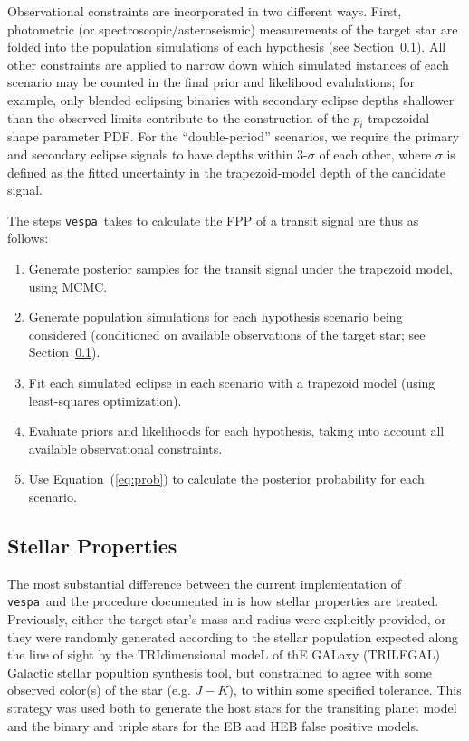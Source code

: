 \documentclass{emulateapj}
\newcommand{\Eq}[1]{Equation~(\ref{eq:#1})}
\newcommand{\eq}[1]{\Eq{#1}}
\newcommand{\sectionname}{Section}
\newcommand{\Sect}[1]{\sectionname~\ref{sect:#1}}
\newcommand{\sect}[1]{\Sect{#1}}
\newcommand{\sectlabel}[1]{\label{sect:#1}}
\newcommand{\vespa}{\texttt{vespa}}
\begin{document}
Observational constraints are incorporated in two different ways.
First, photometric (or spectroscopic/asteroseismic) measurements of
the target star are folded into the population simulations of each
hypothesis (see \sect{methods:stellar}).  All other constraints are
applied to narrow down which simulated instances of each scenario may
be counted in the final prior and likelihood evalulations; for
example, only blended eclipsing binaries with secondary eclipse depths
shallower than the observed limits contribute to the construction of
the $p_i$ trapezoidal shape parameter PDF.  For the ``double-period''
scenarios, we require the primary and secondary eclipse signals to
have depths within 3-$\sigma$ of each other, where $\sigma$ is defined
as the fitted uncertainty in the trapezoid-model depth of the
candidate signal.

The steps \vespa\ takes to calculate the FPP of a transit signal
are thus as follows:
\begin{enumerate}
\item Generate posterior samples for the transit signal under the
  trapezoid model, using MCMC.
\item Generate population simulations for each hypothesis scenario
  being considered (conditioned on available observations of the
  target star; see \sect{methods:stellar}).
\item Fit each simulated eclipse in each scenario with a trapezoid
  model (using least-squares optimization).
\item Evaluate priors and likelihoods for each hypothesis, taking into
  account all available observational constraints.
\item Use \eq{prob} to calculate the posterior probability for each scenario.
\end{enumerate}


\subsection{Stellar Properties}
\sectlabel{methods:stellar}

The most substantial difference between the current implementation of
\vespa\ and the procedure documented in  is
how stellar properties are treated.  Previously, either the target
star's mass and radius were explicitly provided, or they were randomly
generated according to the stellar population expected along the line
of sight by the TRIdimensional modeL of thE GALaxy (TRILEGAL) Galactic
stellar popultion synthesis tool, but constrained to agree with some
observed color(s) of the star (e.g. $J-K$), to within some specified
tolerance.  This strategy was used both to generate the host stars for
the transiting planet model and the binary and triple stars for the EB
and HEB false positive models.
\end{document}

